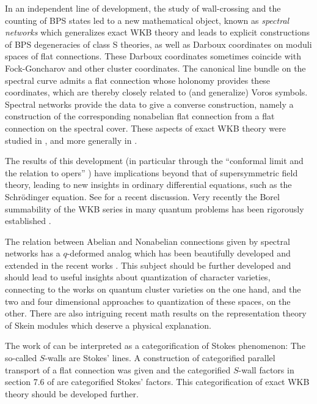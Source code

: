 \documentclass[12pt]{article}
\begin{document}
In an independent line of development, the study of wall-crossing and the counting of BPS states led to a new mathematical object, known as \emph{spectral networks} \cite{Gaiotto:2012rg} which generalizes exact WKB theory and leads to explicit constructions of BPS degeneracies of class S theories, as well as Darboux coordinates on moduli spaces of flat connections. These Darboux coordinates sometimes coincide with Fock-Goncharov and other cluster coordinates. The canonical line bundle on the spectral curve admits a flat connection whose holonomy provides these coordinates, which are thereby closely related to (and generalize) Voros symbols. Spectral   networks provide the data to give a converse   construction, namely a construction of the corresponding nonabelian flat connection from a flat connection on the spectral cover. These aspects of exact WKB theory were studied in  \cite{Gaiotto:2009hg,Gaiotto:2012rg,Gaiotto:2012db,Hollands:2013qza,Codesido:2017jwp}, and more generally in \cite{kontsevich2021analyticity}. 


The results of this development (in particular through the ``conformal limit and the relation to opers'' \cite{Dumitrescu:2016ick,Gaiotto:2014bza})
have implications beyond that of supersymmetric field theory, leading
to new insights in ordinary differential equations, such as the Schr{\"o}dinger equation. See \cite{Grassi:2021wpw} for a recent discussion. 
Very recently
the Borel summability of the WKB series in many quantum
problems has been rigorously established  \cite{Nikolaev:2021xzt}. 

The relation between Abelian and Nonabelian connections given by 
spectral networks has a $q$-deformed analog 
\cite{Galakhov:2014xba,Gabella:2016zxu}  
 which has been beautifully developed and extended in 
the recent works \cite{Neitzke:2020jik,Neitzke:2021gxr,Yan:2020kkb}. This subject should be further 
developed and should lead to useful insights about quantization of 
character varieties, connecting to the works \cite{fock2006moduli,quantumFG:2008,fock2009cluster} on quantum cluster varieties on the one hand, and the two \cite{Gukov:2008ve, Gaiotto:2021kma} and four dimensional  \cite{Nekrasov:2010ka} approaches to quantization of these spaces, on the other. There are also intriguing recent math
results on the representation theory of Skein modules
\cite{Bonahon-Wong} which deserve a physical explanation.

The work of \cite{Gaiotto:2015aoa,Kapranov:2020zoa} can be interpreted as a categorification of Stokes phenomenon: The so-called $S$-walls are Stokes' lines. A 
construction of categorified parallel transport 
of a flat connection was given and 
the categorified $S$-wall factors in section 7.6 of \cite{Gaiotto:2015aoa} are categorified Stokes' factors. This categorification of exact WKB theory should be developed further. 
\end{document}
